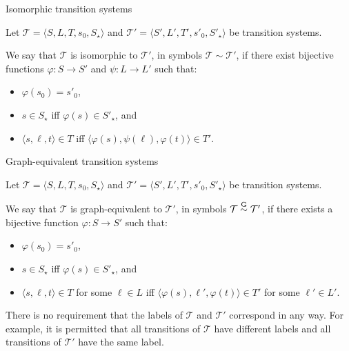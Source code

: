 \documentclass{gkibeamer}
\begin{document}
\begin{frame}{Isomorphic transition systems}
  \begin{definition}
    Let $\mathcal T = \langle S, L, T, s_0, S_\star\rangle$ and
    $\mathcal T' = \langle S', L', T', s'_0, S'_\star\rangle$ be transition
    systems.

    We say that \alert{$\mathcal T$ is isomorphic to
      $\mathcal T'$}, in symbols \alert{$\mathcal T \sim \mathcal
      T'$}, if there exist bijective functions $\varphi: S \to S'$
    and $\psi: L \to L'$ such that:
    \begin{itemize}
    \item $\varphi(s_0) = s'_0$,
    \item $s \in S_\star$ iff $\varphi(s) \in S'_\star$, and
    \item $\langle s, \ell, t\rangle \in T$ iff $\langle \varphi(s),
      \psi(\ell), \varphi(t)\rangle \in T'$.
    \end{itemize}
  \end{definition}
\end{frame}

\begin{frame}{Graph-equivalent transition systems}
  \begin{definition}
    Let $\mathcal T = \langle S, L, T, s_0, S_\star\rangle$ and
    $\mathcal T' = \langle S', L', T', s'_0, S'_\star\rangle$ be transition
    systems.

    We say that \alert{$\mathcal T$ is graph-equivalent to $\mathcal
      T'$}, in symbols \alert{$\mathcal T \stackrel{\textup{G}}{\sim} \mathcal T'$},
    if there exists a bijective function $\varphi: S \to S'$ such
    that:
    \begin{itemize}
    \item $\varphi(s_0) = s'_0$,
    \item $s \in S_\star$ iff $\varphi(s) \in S'_\star$, and
    \item $\langle s, \ell, t\rangle \in T$ for some $\ell \in L$ iff
      $\langle \varphi(s), \ell', \varphi(t)\rangle \in T'$ for some $\ell'
      \in L'$.
    \end{itemize}
  \end{definition}
   There is no requirement that the labels of $\mathcal
  T$ and $\mathcal T'$ correspond in any way. For example, it is
  permitted that all transitions of $\mathcal T$ have different labels
  and all transitions of $\mathcal T'$ have the same label.
\end{frame}
\end{document}
